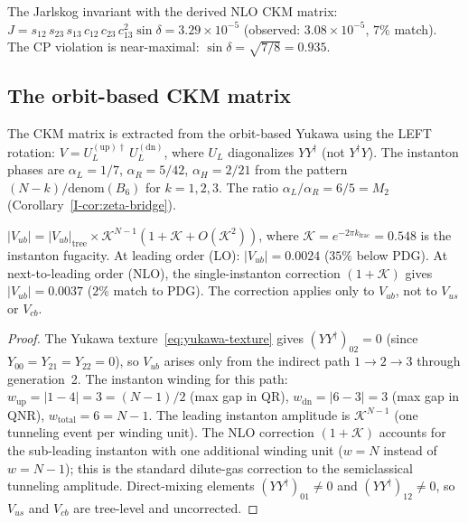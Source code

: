 The Jarlskog invariant with the derived NLO CKM matrix:
$J = s_{12}\,s_{23}\,s_{13}\,c_{12}\,c_{23}\,c_{13}^2\sin\delta
= 3.29 \times 10^{-5}$
(observed: $3.08 \times 10^{-5}$, $7\%$ match).
The CP violation is near-maximal:
$\sin\delta = \sqrt{7/8} = 0.935$.

\subsection{The orbit-based CKM matrix}
\label{sec:ckm-mixing}

The CKM matrix is extracted from the orbit-based Yukawa
using the LEFT rotation: $V = U_L^{(\mathrm{up})\dagger}\,U_L^{(\mathrm{dn})}$,
where $U_L$ diagonalizes $YY^\dagger$ (not $Y^\dagger Y$).
The instanton phases are
$\alpha_L = 1/7$, $\alpha_R = 5/42$, $\alpha_H = 2/21$
from the pattern $(N{-}k)/\mathrm{denom}(B_6)$ for $k = 1,2,3$.
The ratio $\alpha_L/\alpha_R = 6/5 = M_2$
(Corollary~\ref*{I-cor:zeta-bridge}).

\begin{derivation}
\label{thm:instanton-vub}
$|V_{ub}| = |V_{ub}|_{\mathrm{tree}} \times \mathcal{K}^{N-1}(1 + \mathcal{K} + O(\mathcal{K}^2))$,
where $\mathcal{K} = e^{-2\pi k_{\mathrm{frac}}} = 0.548$ is the
instanton fugacity.
At leading order (LO): $|V_{ub}| = 0.0024$ ($35\%$ below PDG).
At next-to-leading order (NLO), the single-instanton
correction $(1 + \mathcal{K})$ gives $|V_{ub}| = 0.0037$
($2\%$ match to PDG).
The correction applies only to $V_{ub}$,
not to $V_{us}$ or $V_{cb}$.
\end{derivation}
\begin{proof}
The Yukawa texture~\eqref{eq:yukawa-texture} gives
$(YY^\dagger)_{02} = 0$
(since $Y_{00} = Y_{21} = Y_{22} = 0$),
so $V_{ub}$ arises only from the indirect path
$1 \to 2 \to 3$ through generation~2.
The instanton winding for this path:
$w_{\mathrm{up}} = |1-4| = 3 = (N{-}1)/2$ (max gap in QR),
$w_{\mathrm{dn}} = |6-3| = 3$ (max gap in QNR),
$w_{\mathrm{total}} = 6 = N{-}1$.
The leading instanton amplitude is $\mathcal{K}^{N-1}$
(one tunneling event per winding unit).
The NLO correction $(1 + \mathcal{K})$ accounts for the
sub-leading instanton with one additional winding unit
($w = N$ instead of $w = N{-}1$);
this is the standard dilute-gas correction to the
semiclassical tunneling amplitude.
Direct-mixing elements $(YY^\dagger)_{01} \neq 0$ and
$(YY^\dagger)_{12} \neq 0$, so $V_{us}$ and $V_{cb}$
are tree-level and uncorrected.
\end{proof}

